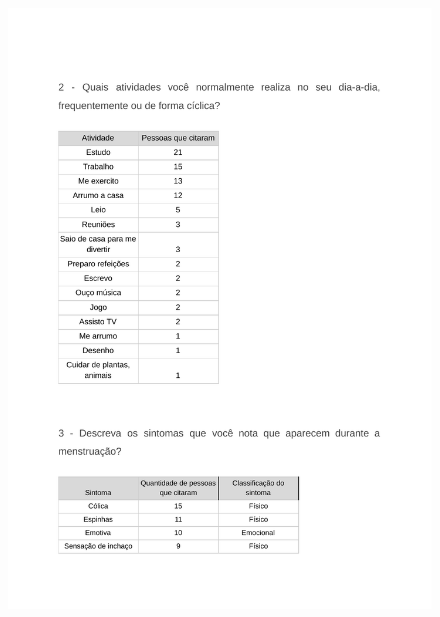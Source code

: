 \begin{apendicesenv}
    \begin{figure}[h]
        \centering
        \includegraphics[keepaspectratio=true,scale=0.7]{figuras/Tab16.pdf}
    \end{figure}
    

\end{apendicesenv}
